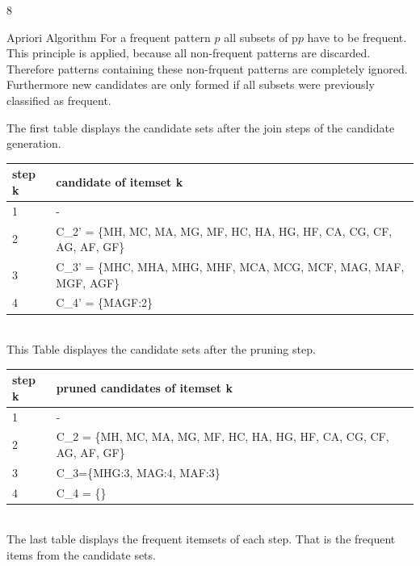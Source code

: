 \documentclass{article}
\begin{document}
\begin{ukon-infie}[10.01.18]{8}
		\begin{exercise}[p=5]{Apriori Algorithm}
\question{}
{
	For a frequent pattern $p$ all subsets of p$p$ have to be frequent.\\
	This principle is applied, because all non-frequent patterns are discarded. Therefore patterns containing these non-frquent patterns are completely ignored.\\
	Furthermore new candidates are only formed if all subsets were previously classified as frequent.
}
\question{}
{
The first table displays the candidate sets after the join steps of the candidate generation.\\
\begin{tabular}{|l|l|}
\hline
step k & candidate of itemset k                                                 \\ \hline
1      & -                                                                      \\ \hline
2      & C\_2' = \{MH, MC, MA, MG, MF, HC, HA, HG, HF, CA, CG, CF, AG, AF, GF\} \\ \hline
3      & C\_3' = \{MHC, MHA, MHG, MHF, MCA, MCG, MCF, MAG, MAF, MGF, AGF\}      \\ \hline
4      & C\_4' = \{MAGF:2\}                                                     \\ \hline
\end{tabular}\\
This Table displayes the candidate sets after the pruning step.\\
\begin{tabular}{|l|l|}
\hline
step k & pruned candidates of itemset k                                        \\ \hline
1      & -                                                                     \\ \hline
2      & C\_2 = \{MH, MC, MA, MG, MF, HC, HA, HG, HF, CA, CG, CF, AG, AF, GF\} \\ \hline
3      & C\_3=\{MHG:3, MAG:4, MAF:3\}                                          \\ \hline
4      & C\_4 = \{\}                                                           \\ \hline
\end{tabular}\\
The last table displays the frequent itemsets of each step. That is the frequent items from the candidate sets.\\ 
\begin{tabular}{|l|l|}

\end{tabular}}
\end{exercise}
\end{ukon-infie}
\end{document}
